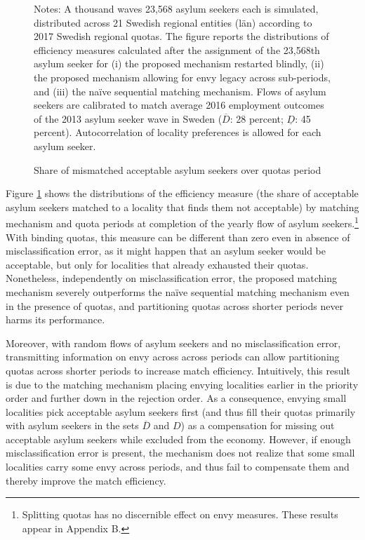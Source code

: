 \documentclass[12pt,fleqn]{article}
\begin{document}
\begin{figure}
	\caption{Share of mismatched acceptable asylum seekers over quotas period \label{FIG-quotas}}
	\begin{center}
	\end{center}
		{\scriptsize \vspace{-1em}
	\begin{singlespace}
		{\sc Notes:} A thousand waves 23,568 asylum seekers each is simulated, distributed across 21 Swedish regional entities (l\"{a}n) according to 2017 Swedish regional quotas. The figure reports the distributions of efficiency measures calculated after the assignment of the 23,568th asylum seeker for (i) the proposed mechanism restarted blindly, (ii) the proposed mechanism allowing for envy legacy across sub-periods, and (iii) the na\"{i}ve sequential matching mechanism. Flows of asylum seekers are calibrated to match average 2016 employment outcomes of the 2013 asylum seeker wave in Sweden ($\overline{D}$: 28 percent; $\underline{D}$: 45 percent). Autocorrelation of locality preferences is allowed for each asylum seeker.
	\end{singlespace}
	 }
\end{figure}

Figure \ref{FIG-quotas} shows the distributions of the efficiency measure (the share of acceptable asylum seekers matched to a locality that finds them not acceptable) by matching mechanism and quota periods at completion of the yearly flow of asylum seekers.\footnote{Splitting quotas has no discernible effect on envy measures. These results appear in Appendix B.} With binding quotas, this measure can be different than zero even in absence of misclassification error, as it might happen that an asylum seeker would be acceptable, but only for localities that already exhausted their quotas. Nonetheless, independently on misclassification error, the proposed matching mechanism severely outperforms the na\"{i}ve sequential matching mechanism even in the presence of quotas, and partitioning quotas across shorter periods never harms its performance.

Moreover, with random flows of asylum seekers and no misclassification error, transmitting information on envy across across periods can allow partitioning quotas across shorter periods to increase match efficiency. Intuitively, this result is due to the matching mechanism placing envying localities earlier in the priority order and further down in the rejection order. As a consequence, envying small localities pick acceptable asylum seekers first (and thus fill their quotas primarily with asylum seekers in the sets $\overline{D}$ and $D$) as a compensation for missing out acceptable asylum seekers while excluded from the economy. However, if enough misclassification error is present, the mechanism does not realize that some small localities carry some envy across periods, and thus fail to compensate them and thereby improve the match efficiency.
\end{document}
